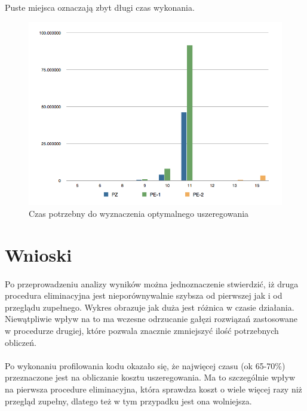 \documentclass[wide,a4paper,titlepage,12pt] {article}
\begin{document}
  Puste miejsca oznaczają zbyt długi czas wykonania.

  \begin{figure}[htbp]
    \begin{center}
      \includegraphics[scale=0.6]{wyk.png}
      \caption{Czas potrzebny do wyznaczenia optymalnego uszeregowania}
    \end{center}
  \end{figure}

  \newpage

  \section{Wnioski}
  \paragraph{}
  Po przeprowadzeniu analizy wyników można jednoznaczenie stwierdzić, iż druga procedura eliminacyjna
  jest nieporównywalnie szybsza od pierwszej jak i od przeglądu zupełnego.
  Wykres obrazuje jak duża jest różnica w czasie działania.
  Niewątpliwie wpływ na to ma wczesne odrzucanie gałęzi rozwiązań zastosowane w procedurze drugiej, które pozwala
  znacznie zmniejszyć ilość potrzebnych obliczeń.

  \paragraph{}
  Po wykonaniu profilowania kodu okazało się, że najwięcej czasu (ok 65-70\%) przeznaczone jest na obliczanie
  kosztu uszeregowania. Ma to szczególnie wpływ na pierwsza procedure eliminacyjna, która sprawdza koszt o wiele więcej razy
  niż przegląd zupełny, dlatego też w tym przypadku jest ona wolniejsza.
\end{document}
